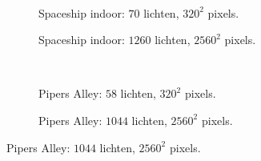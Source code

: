\begin{figure}[t]
\begin{subfigure}[b]{\textwidth}
  \end{subfigure}\hfill\\
  \begin{adjustbox}{minipage=\textwidth, scale=0.55}
    \begin{subfigure}[b]{0.8\textwidth}
      \centering
      \def\svgwidth{\textwidth}
      
      \caption{Spaceship indoor: $70$ lichten, $320^2$ pixels.}
      \label{fig:cs-lc-frames-deferred:indoor-low}
    \end{subfigure}
  \end{adjustbox}\hspace{-0.075\textwidth}  %
  \begin{adjustbox}{minipage=\textwidth, scale=0.55}
    \begin{subfigure}[b]{0.8\textwidth}
      \centering
      \def\svgwidth{\textwidth}
      
      \caption{Spaceship indoor: $1260$ lichten, $2560^2$ pixels.}
      \label{fig:cs-lc-frames-deferred:indoor-high}
    \end{subfigure}
  \end{adjustbox} \\
  \begin{adjustbox}{minipage=\textwidth, scale=0.55}
    \begin{subfigure}[b]{0.8\textwidth}
      \centering
      \def\svgwidth{\textwidth}
      
      \caption{Pipers Alley: $58$ lichten, $320^2$ pixels.}
      \label{fig:cs-lc-frames-deferred:alley-low}
    \end{subfigure}
  \end{adjustbox}\hspace{-0.075\textwidth}  %
  \begin{adjustbox}{minipage=\textwidth, scale=0.55}
    \begin{subfigure}[b]{0.8\textwidth}
      \centering
      \def\svgwidth{\textwidth}
      
      \caption{Pipers Alley: $1044$ lichten, $2560^2$ pixels.}

\end{subfigure}
\end{adjustbox}
\end{figure}

